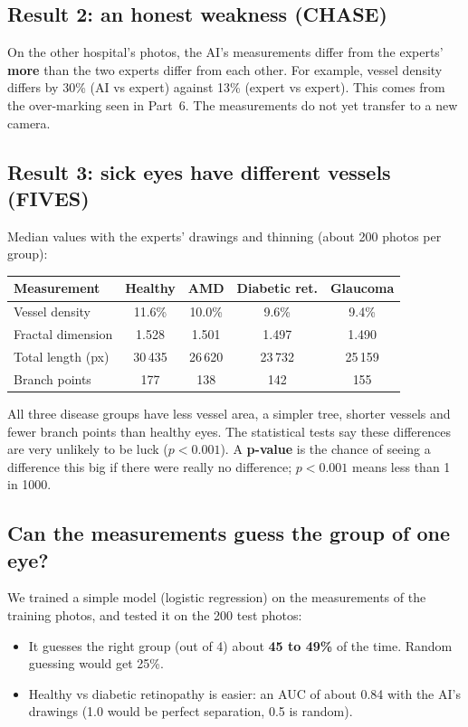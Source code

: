 \documentclass[11pt,a4paper]{article}
\begin{document}
\subsection{Result 2: an honest weakness (CHASE)}
On the other hospital's photos, the AI's measurements differ from the experts' \textbf{more} than the two experts differ from each other. For example, vessel density differs by 30\% (AI vs expert) against 13\% (expert vs expert). This comes from the over-marking seen in Part~6. The measurements do not yet transfer to a new camera.

\subsection{Result 3: sick eyes have different vessels (FIVES)}
Median values with the experts' drawings and thinning (about 200 photos per group):
\begin{center}
\begin{tabular}{@{}lcccc@{}}
\toprule
\textbf{Measurement} & \textbf{Healthy} & \textbf{AMD} & \textbf{Diabetic ret.} & \textbf{Glaucoma} \\
\midrule
Vessel density & 11.6\% & 10.0\% & 9.6\% & 9.4\% \\
Fractal dimension & 1.528 & 1.501 & 1.497 & 1.490 \\
Total length (px) & 30\,435 & 26\,620 & 23\,732 & 25\,159 \\
Branch points & 177 & 138 & 142 & 155 \\
\bottomrule
\end{tabular}
\end{center}
All three disease groups have less vessel area, a simpler tree, shorter vessels and fewer branch points than healthy eyes. The statistical tests say these differences are very unlikely to be luck ($p < 0.001$). A \textbf{p-value} is the chance of seeing a difference this big if there were really no difference; $p < 0.001$ means less than 1 in 1000.

\subsection{Can the measurements guess the group of one eye?}
We trained a simple model (logistic regression) on the measurements of the training photos, and tested it on the 200 test photos:
\begin{itemize}
  \item It guesses the right group (out of 4) about \textbf{45 to 49\%} of the time. Random guessing would get 25\%.
  \item Healthy vs diabetic retinopathy is easier: an AUC of about 0.84 with the AI's drawings (1.0 would be perfect separation, 0.5 is random).
\end{itemize}
\end{document}
